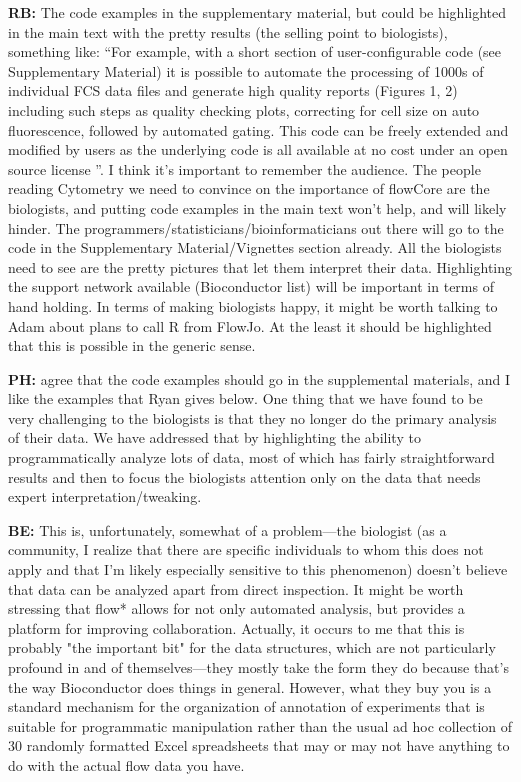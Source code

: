 \documentclass[12pt]{article}
\begin{document}
{\bf RB:} The code examples in the supplementary material, but could
be highlighted in the main text with the pretty results (the selling
point to biologists), something like: “For example, with a short
section of user-configurable code (see Supplementary Material) it is
possible to automate the processing of 1000s of individual FCS data
files and generate high quality reports (Figures 1, 2) including such
steps as quality checking plots, correcting for cell size on auto
fluorescence, followed by automated gating.  This code can be freely
extended and modified by users as the underlying code is all available
at no cost under an open source license ”.  I think it’s important
to remember the audience. The people reading Cytometry we need to
convince on the importance of flowCore are the biologists, and putting
code examples in the main text won’t help, and will likely
hinder. The programmers/statisticians/bioinformaticians out there will
go to the code in the Supplementary Material/Vignettes section
already. All the biologists need to see are the pretty pictures that
let them interpret their data. Highlighting the support network
available (Bioconductor list) will be important in terms of hand
holding.  In terms of making biologists happy, it might be worth
talking to Adam about plans to call R from FlowJo. At the least it
should be highlighted that this is possible in the generic sense.

{\bf PH:} agree that the code examples should go in the supplemental
materials, and I like the examples that Ryan gives below. One thing
that we have found to be very challenging to the biologists is that
they no longer do the primary analysis of their data. We have
addressed that by highlighting the ability to programmatically analyze
lots of data, most of which has fairly straightforward results and
then to focus the biologists attention only on the data that needs
expert interpretation/tweaking.

{\bf BE:} This is, unfortunately, somewhat of a problem---the biologist (as
a community, I realize that there are specific individuals to whom
this does not apply and that I'm likely especially sensitive to this
phenomenon) doesn't believe that data can be analyzed apart from
direct inspection. It might be worth stressing that flow* allows for
not only automated analysis, but provides a platform for improving
collaboration. Actually, it occurs to me that this is probably "the
important bit" for the data structures, which are not particularly
profound in and of themselves---they mostly take the form they do
because that's the way Bioconductor does things in general. However,
what they buy you is a standard mechanism for the organization of
annotation of experiments that is suitable for programmatic
manipulation rather than the usual ad hoc collection of 30 randomly
formatted Excel spreadsheets that may or may not have anything to do
with the actual flow data you have.
\end{document}
